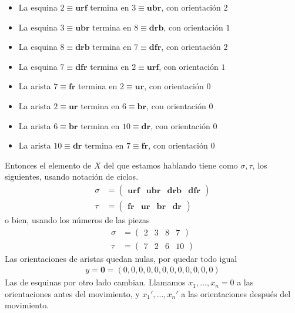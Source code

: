 \documentclass{article}
\theoremstyle{definition}
\renewcommand{\r}{\textbf{r}}
\renewcommand{\u}{\textbf{u}}
\renewcommand{\b}{\textbf{b}}
\newcommand{\f}{\textbf{f}}
\renewcommand{\d}{\textbf{d}}
\begin{document}
\begin{itemize}
    \item La esquina $2\equiv\u\r\f $ termina en $3\equiv \u\b\r$, con orientación $2$
    \item La esquina $3\equiv\u\b\r$ termina en $8\equiv\d\r\b$, con orientación $1$
    \item La esquina $8\equiv\d\r\b$ termina en $7\equiv\d\f\r$, con orientación $2$
    \item La esquina $7\equiv \d\f\r$ termina en $2\equiv \u\r\f$, con orientación $1$
    \item La arista $7\equiv\f\r$ termina en $2\equiv\u\r$, con orientación $0$
    \item La arista $2\equiv \u\r$ termina en $6\equiv \b\r$, con orientación $0$
    \item La arista $6\equiv \b\r$ termina en $10\equiv \d\r$, con orientación $0$
    \item La arista $10\equiv \d\r$ termina en $7\equiv\f\r$, con orientación $0$
\end{itemize}
Entonces el elemento de $X$ del que estamos hablando tiene como $\sigma, \tau$, los siguientes, usando notación de ciclos.
\begin{align*}
    \sigma & =\begin{pmatrix}
                  \u\r\f & \u\b\r & \d\r\b & \d\f\r
              \end{pmatrix} \\
    \tau   & =\begin{pmatrix}
                  \f\r & \u\r & \b\r & \d\r
              \end{pmatrix}
\end{align*}
o bien, usando los números de las piezas
\begin{align*}
    \sigma & =\begin{pmatrix}
                  2 & 3 & 8 & 7
              \end{pmatrix} \\
    \tau   & =\begin{pmatrix}
                  7 & 2 & 6 & 10
              \end{pmatrix}
\end{align*}
Las orientaciones de aristas quedan nulas, por quedar todo igual
\begin{align*}
    y=\mathbf{0}=(0,0,0,0,0,0,0,0,0,0,0,0)
\end{align*}
Las de esquinas por otro lado cambian. Llamamos $x_1,\dots,x_n=0$ a las orientaciones antes del movimiento, y $x_1',\dots,x_n'$ a las orientaciones después del movimiento.
\end{document}
